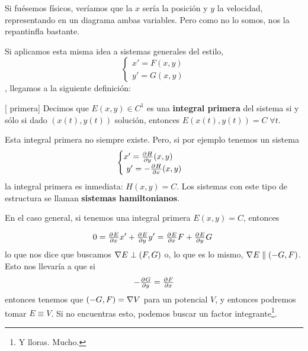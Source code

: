 Si fuésemos físicos, veríamos que la $x$ sería la posición y $y$ la velocidad, representando en un diagrama ambas variables. Pero como no lo somos, nos la repantinfla bastante.


Si aplicamos esta misma idea a sistemas generales del estilo, \[ \begin{cases} x' = F(x,y) \\ y' = G(x,y) \end{cases} \], llegamos a la siguiente definición:

\begin{definition}[ primera] Decimos que $E(x,y) ∈ C^1$ es una \textbf{integral primera} del sistema si y sólo si dado $(x(t),y(t))$ solución, entonces $E(x(t),y(t)) = C\;∀t$.
\end{definition}

Esta integral primera no siempre existe. Pero, si por ejemplo tenemos un sistema \[ \begin{cases} x' = \pd{H}{y}(x,y) \\ y' = -\pd{H}{x}(x,y) \end{cases} \] la integral primera es inmediata: $H(x,y) = C$. Los sistemas con este tipo de estructura se llaman \textbf{sistemas hamiltonianos}.

En el caso general, si tenemos una integral primera $E(x,y) = C$, entonces

\[ 0 = \pd{E}{x}x' + \pd{E}{y} y' = \pd{E}{x}F + \pd{E}{y} G 
\]
lo que nos dice que buscamos $\nabla E \perp (F,G)$ o, lo que es lo mismo, $\nabla E \parallel (-G,F)$. Esto nos llevaría a que si \[ -\pd{G}{y} = \pd{F}{x}\] entonces tenemos que $(-G,F) = \nabla V$ para un potencial $V$, y entonces podremos tomar $E\equiv V$. Si no encuentras esto, podemos buscar un factor integrante\footnote{Y lloras. Mucho.}.

